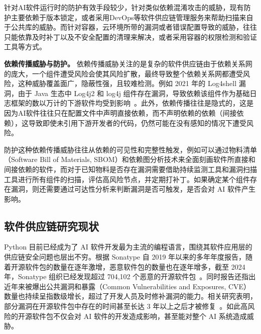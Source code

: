 针对AI软件运行时的防护有效手段较少，针对类似依赖混淆攻击的威胁，现有防护主要依赖于版本锁定，或者采用DevOps等软件供应链管理服务来帮助扫描来自于公共库的威胁。而针对容器，云环境所带的漏洞或者错误配置导致的威胁，往往只能依靠及时补丁以及不安全配置的清理来解决，或者采用容器的权限检测和验证工具等方式。

\textbf{依赖传播威胁与防护。}
依赖传播威胁关注的是复杂的软件供应链由于依赖关系网的庞大，一个组件遭受风险会使其风险扩散，最终导致整个依赖关系网都遭受风险，这种威胁覆盖面广，隐蔽性强，且较难检测。例如 2021 年的 Log4shell 漏洞，由于 Java 生态中 Log4j2 和 log4j 组件存在漏洞，导致依赖该组件作为基础日志框架的数以万计的下游软件均受到影响~\cite{cve_2021_44228}。此外，依赖传播往往是隐式的，这是因为AI软件往往只在配置文件中声明直接依赖，而不声明依赖的依赖（间接依赖），这导致即使未引用下游开发者的代码，仍然可能在没有感知的情况下遭受风险。

防护这种依赖传播威胁往往从依赖的可见性和完整性触发，例如可以通过物料清单（Software Bill of Materials, SBOM）和依赖图分析技术来全面刻画软件所直接和间接依赖的软件，而对于已知物料是否存在漏洞需要借助持续监测工具和漏洞扫描工具进行所有组件的扫描，评估高风险节点，并定期打补丁。如果确定某个组件存在漏洞，则还需要通过可达性分析来判断漏洞是否可触发，是否会对 AI 软件产生影响。

\subsection{软件供应链研究现状}
Python 目前已经成为了 AI 软件开发最为主流的编程语言，围绕其软件应用层的供应链安全问题也层出不穷。根据 Sonatype 自 2019 年以来的多年年度报告，随着开源软件包的数量在逐年激增，恶意软件包的数量也在逐年增多，截至 2024 年，Sonatype 组织已经发现超过 704,102 个恶意的开源软件包~\cite{sonatype2021}。同时报告还指出近年来被爆出公共漏洞和暴露（Common Vulnerabilities and Exposures, CVE）数量也持续呈指数级增长，超过了开发人员及时修补漏洞的能力。相关研究表明，部分漏洞在开源软件包中存在的时间甚至长达 3 年以上之后才被修复~\cite{akhoundali2024morefixes}。如此高风险的开源软件包不仅会对 AI 软件的开发造成影响，甚至能对整个 AI 系统造成威胁。

